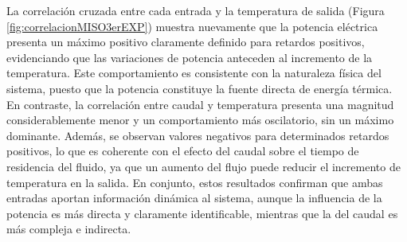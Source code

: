\documentclass[11pt]{report}
\begin{document}
La correlación cruzada entre cada entrada y la temperatura de salida (Figura \ref{fig:correlacionMISO3erEXP}) muestra nuevamente que la potencia eléctrica presenta un máximo positivo claramente definido para retardos positivos, evidenciando que las variaciones de potencia anteceden al incremento de la temperatura. Este comportamiento es consistente con la naturaleza física del sistema, puesto que la potencia constituye la fuente directa de energía térmica. En contraste, la correlación entre caudal y temperatura presenta una magnitud considerablemente menor y un comportamiento más oscilatorio, sin un máximo dominante. Además, se observan valores negativos para determinados retardos positivos, lo que es coherente con el efecto del caudal sobre el tiempo de residencia del fluido, ya que un aumento del flujo puede reducir el incremento de temperatura en la salida. En conjunto, estos resultados confirman que ambas entradas aportan información dinámica al sistema, aunque la influencia de la potencia es más directa y claramente identificable, mientras que la del caudal es más compleja e indirecta.
\end{document}
